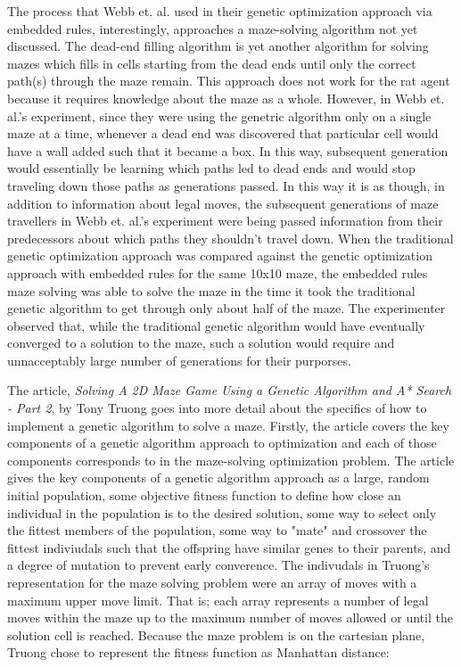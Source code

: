 \documentclass[12pt]{article}
\begin{document}
\hspace*{\parindent} The process that Webb et. al. used in their genetic optimization approach via embedded rules, interestingly, approaches a maze-solving algorithm not yet discussed. The dead-end filling algorithm is yet another algorithm for solving mazes which fills in cells starting from the dead ends until only the correct path(s) through the maze remain. This approach does not work for the rat agent because it requires knowledge about the maze as a whole. However, in Webb et. al.'s experiment, since they were using the genetric algorithm only on a single maze at a time, whenever a dead end was discovered that particular cell would have a wall added such that it became a box. In this way, subsequent generation would essentially be learning which paths led to dead ends and would stop traveling down those paths as generations passed. In this way it is as though, in addition to information about legal moves, the subsequent generations of maze travellers in Webb et. al.'s experiment were being passed information from their predecessors about which paths they shouldn't travel down. When the traditional genetic optimization approach was compared against the genetic optimization approach with embedded rules for the same 10x10 maze, the embedded rules maze solving was able to solve the maze in the time it took the traditional genetic algorithm to get through only about half of the maze. The experimenter observed that, while the traditional genetic algorithm would have eventually converged to a solution to the maze, such a solution would require and unnacceptably large number of generations for their purporses.

\hspace*{\parindent} The article, \textit{Solving A 2D Maze Game Using a Genetic Algorithm and A* Search - Part 2}, by Tony Truong goes into more detail about the specifics of how to implement a genetic algorithm to solve a maze. Firstly, the article covers the key components of a genetic algorithm approach to optimization and each of those components corresponds to in the maze-solving optimization problem. The article gives the key components of a genetic algorithm approach as a large, random initial population, some objective fitness function to define how close an individual in the population is to the desired solution, some way to select only the fittest members of the population, some way to "mate" and crossover the fittest indiviudals such that the offspring have similar genes to their parents, and a degree of mutation to prevent early converence.  The indivudals in Truong's representation for the maze solving problem were an array of moves with a maximum upper move limit. That is; each array represents a number of legal moves within the maze up to the maximum number of moves allowed or until the solution cell is reached. Because the maze problem is on the cartesian plane, Truong chose to represent the fitness function as Manhattan distance:
\end{document}
